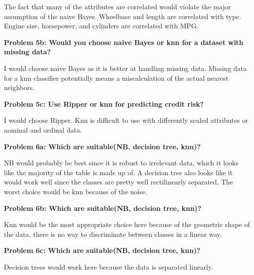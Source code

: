 \documentclass[11pt]{article}
\numberwithin{equation}{section}  %
\begin{document}
The fact that many of the attributes are correlated would violate the major assumption of the naive Bayes. Wheelbase and length are correlated with type. Engine size, horsepower, and cylinders are correlated with MPG.
\vspace*{0.25in}

\noindent\textbf{Problem 5b: Would you choose naive Bayes or knn for a dataset with missing data?}
\vspace*{0.25in}

I would choose naive Bayes as it is better at handling missing data. Missing data for a knn classifier potentially means a miscalculation of the actual nearest neighbors.
\vspace*{0.25in}

\noindent\textbf{Problem 5c: Use Ripper or knn for predicting credit risk?}
\vspace*{0.25in}

I would choose Ripper. Knn is difficult to use with differently scaled attributes or nominal and ordinal data.
\vspace*{0.25in}

\noindent\textbf{Problem 6a: Which are suitable(NB, decision tree, knn)?}
\vspace*{0.25in}

NB would probably be best since it is robust to irrelevant data, which it looks like the majority of the table is made up of. A decision tree also looks like it would work well since the classes are pretty well rectilinearly separated. The worst choice would be knn because of the noise.
\vspace*{0.25in}

\noindent\textbf{Problem 6b: Which are suitable(NB, decision tree, knn)?}
\vspace*{0.25in}

Knn would be the most appropriate choice here because of the geometric shape of the data. there is no way to discriminate between classes in a linear way.
\vspace*{0.25in}

\noindent\textbf{Problem 6c: Which are suitable(NB, decision tree, knn)?}
\vspace*{0.25in}

Decision trees would work here because the data is separated linearly.
\vspace*{0.25in}
\end{document}
